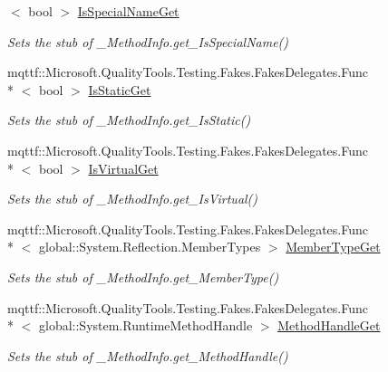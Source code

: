 \begin{DoxyCompactItemize}
$<$ bool $>$ \hyperlink{class_system_1_1_runtime_1_1_interop_services_1_1_fakes_1_1_stub___method_info_a0a6977f6469066c87e3bb980c9af8c5b}{Is\-Special\-Name\-Get}
\begin{DoxyCompactList}\small\item\em Sets the stub of \-\_\-\-Method\-Info.\-get\-\_\-\-Is\-Special\-Name()\end{DoxyCompactList}\item 
mqttf\-::\-Microsoft.\-Quality\-Tools.\-Testing.\-Fakes.\-Fakes\-Delegates.\-Func\\*
$<$ bool $>$ \hyperlink{class_system_1_1_runtime_1_1_interop_services_1_1_fakes_1_1_stub___method_info_ae31e898b26f3d415d103acbeae1c2522}{Is\-Static\-Get}
\begin{DoxyCompactList}\small\item\em Sets the stub of \-\_\-\-Method\-Info.\-get\-\_\-\-Is\-Static()\end{DoxyCompactList}\item 
mqttf\-::\-Microsoft.\-Quality\-Tools.\-Testing.\-Fakes.\-Fakes\-Delegates.\-Func\\*
$<$ bool $>$ \hyperlink{class_system_1_1_runtime_1_1_interop_services_1_1_fakes_1_1_stub___method_info_a876d4daedcda37cd18fcc18d97cef079}{Is\-Virtual\-Get}
\begin{DoxyCompactList}\small\item\em Sets the stub of \-\_\-\-Method\-Info.\-get\-\_\-\-Is\-Virtual()\end{DoxyCompactList}\item 
mqttf\-::\-Microsoft.\-Quality\-Tools.\-Testing.\-Fakes.\-Fakes\-Delegates.\-Func\\*
$<$ global\-::\-System.\-Reflection.\-Member\-Types $>$ \hyperlink{class_system_1_1_runtime_1_1_interop_services_1_1_fakes_1_1_stub___method_info_aefdf7166e7a031f24c7345243eaabd40}{Member\-Type\-Get}
\begin{DoxyCompactList}\small\item\em Sets the stub of \-\_\-\-Method\-Info.\-get\-\_\-\-Member\-Type()\end{DoxyCompactList}\item 
mqttf\-::\-Microsoft.\-Quality\-Tools.\-Testing.\-Fakes.\-Fakes\-Delegates.\-Func\\*
$<$ global\-::\-System.\-Runtime\-Method\-Handle $>$ \hyperlink{class_system_1_1_runtime_1_1_interop_services_1_1_fakes_1_1_stub___method_info_abe8af020a530c3d250af6790fac9b876}{Method\-Handle\-Get}
\begin{DoxyCompactList}\small\item\em Sets the stub of \-\_\-\-Method\-Info.\-get\-\_\-\-Method\-Handle()\end{DoxyCompactList}\item 

\end{DoxyCompactItemize}
